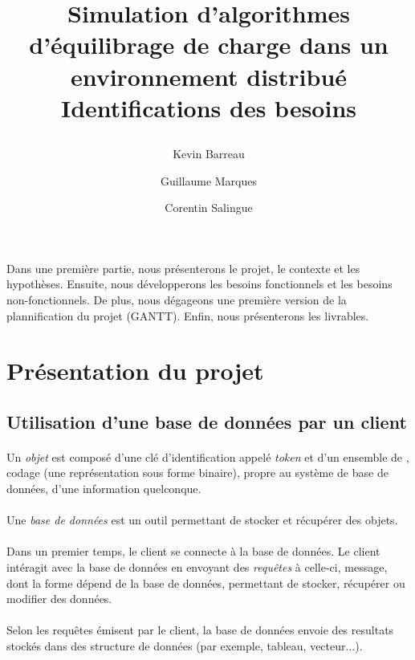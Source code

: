 \documentclass[12pt]{article}
\title{
 \begin{minipage}\linewidth
        \centering
        Simulation d'algorithmes d'équilibrage de charge dans un environnement distribué 
        \vskip3pt
        \large Identifications des besoins
    \end{minipage}
 }
\author{Kevin Barreau \and Guillaume Marques \and Corentin Salingue}
\begin{document}
\maketitle

\abstract
Dans une première partie, nous présenterons le projet, le contexte et les hypothèses. Ensuite, nous développerons les besoins fonctionnels et les besoins non-fonctionnels.
De plus, nous dégageons une première version de la plannification du projet (GANTT). Enfin, nous présenterons les livrables.



\newpage


\renewcommand{\contentsname}{Sommaire} 
\tableofcontents



\newpage

\section{Présentation du projet}

\subsection{Utilisation d'une base de données par un client}

\paragraph{} Un \textit{objet} est composé d'une clé d'identification appelé \textit{token} et d'un ensemble de , codage (une représentation sous forme binaire), propre au système de base de données, d'une information quelconque.

\paragraph{} Une \textit{base de données} est un outil permettant de stocker et récupérer des objets.

\paragraph{} Dans un premier temps, le client se connecte à la base de données.
Le client intéragit avec la base de données en envoyant des \textit{requêtes} à celle-ci, message, dont la forme dépend de la base de données, permettant de stocker, récupérer ou modifier des données.

\paragraph{}Selon les requêtes émisent par le client, la base de données envoie des resultats stockés dans des structure de données (par exemple, tableau, vecteur...).
\end{document}
